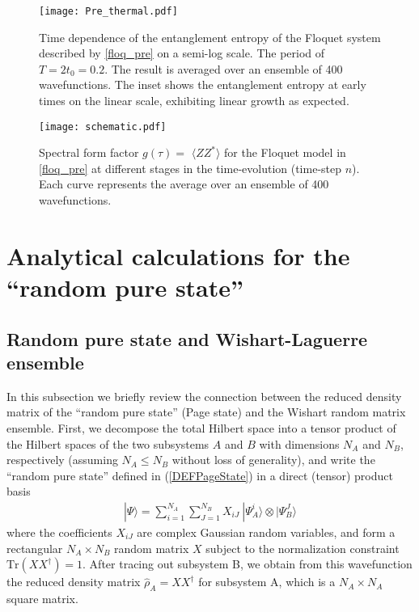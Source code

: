 \documentclass[aps,prb,preprint,onecolumn,amsmath,amssymb,superscriptaddress,eqsecnum,floatfix,scrartcl]{revtex4-1}
\begin{document}
\begin{figure}%
\centering
\texttt{[image: Pre\_thermal.pdf]}
\caption{Time dependence of the entanglement entropy
of  the Floquet system described by \eqref{floq_pre} on 
a semi-log scale.
The period of $T= 2 t_0 = 0.2$.
The result is averaged over an ensemble of 400 wavefunctions.
 The inset
shows the entanglement entropy  at early times on the linear scale, 
exhibiting linear growth as expected.
 }
\label{fig:prethermal_EE}
\end{figure}





\begin{figure}%
\centering
\texttt{[image: schematic.pdf]}
\caption{Spectral form factor $g(\tau)=$ $\langle ZZ^*\rangle$ for the Floquet model in \eqref{floq_pre} at different stages in the time-evolution
(time-step $n$). 
Each curve 
represents the average over an ensemble of 400 wavefunctions.} 
\label{fig:prethermal_z2}
\end{figure}



\section{Analytical calculations for the  ``random pure state''}
\label{analytical}



\subsection{Random pure state and Wishart-Laguerre ensemble}
\label{SubSectionRandomPureStateWishart}

In this subsection we briefly review the connection between  the reduced density matrix of the ``random pure state'' (Page state)
and  the Wishart random matrix ensemble.
First, we
decompose the total Hilbert space into
a tensor product of the Hilbert spaces of
 the two subsystems $A$ and $B$
 with dimensions $N_A$ and $N_B$, respectively
(assuming $N_A \leq N_B$ without loss of generality), and write the ``random pure state'' defined in   (\ref{DEFPageState})
 in a direct (tensor) product basis
\begin{align}
|\Psi\rangle=\sum_{i=1}^{N_A} \sum_{J=1}^{N_B} X_{iJ} \ |\Psi_A^i\rangle\otimes|\Psi_B^J\rangle
\end{align}
where the coefficients $X_{iJ}$ are complex Gaussian random variables,  and form a rectangular $N_A\times N_B$ random matrix $X$ subject to the normalization constraint $\mbox{Tr}(XX^{\dag})=1$. After tracing out subsystem B, we obtain from this wavefunction
 the reduced density matrix  ${\hat \rho}_A=XX^{\dag}$ for subsystem A, which is a $N_A\times N_A$ square matrix.
\end{document}
